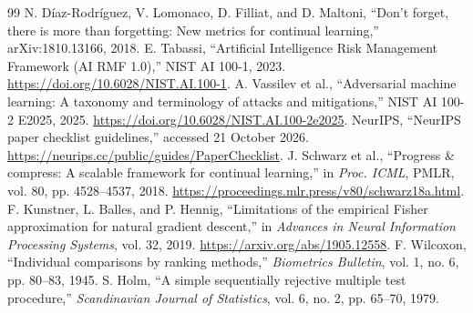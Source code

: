 \documentclass[10pt,a4paper]{article}
\begin{document}
\begin{thebibliography}{99}
 N. D\'iaz-Rodr\'iguez, V. Lomonaco, D. Filliat, and D. Maltoni, \enquote{Don't forget, there is more than forgetting: New metrics for continual learning,} arXiv:1810.13166, 2018.
 E. Tabassi, \enquote{Artificial Intelligence Risk Management Framework (AI RMF 1.0),} NIST AI 100-1, 2023. \url{https://doi.org/10.6028/NIST.AI.100-1}.
 A. Vassilev et al., \enquote{Adversarial machine learning: A taxonomy and terminology of attacks and mitigations,} NIST AI 100-2 E2025, 2025. \url{https://doi.org/10.6028/NIST.AI.100-2e2025}.
 NeurIPS, \enquote{NeurIPS paper checklist guidelines,} accessed 21 October 2026. \url{https://neurips.cc/public/guides/PaperChecklist}.
 J. Schwarz et al., \enquote{Progress \& compress: A scalable framework for continual learning,} in \emph{Proc. ICML}, PMLR, vol. 80, pp. 4528--4537, 2018. \url{https://proceedings.mlr.press/v80/schwarz18a.html}.
 F. Kunstner, L. Balles, and P. Hennig, \enquote{Limitations of the empirical Fisher approximation for natural gradient descent,} in \emph{Advances in Neural Information Processing Systems}, vol. 32, 2019. \url{https://arxiv.org/abs/1905.12558}.
 F. Wilcoxon, \enquote{Individual comparisons by ranking methods,} \emph{Biometrics Bulletin}, vol. 1, no. 6, pp. 80--83, 1945.
 S. Holm, \enquote{A simple sequentially rejective multiple test procedure,} \emph{Scandinavian Journal of Statistics}, vol. 6, no. 2, pp. 65--70, 1979.
\end{thebibliography}
\end{document}
